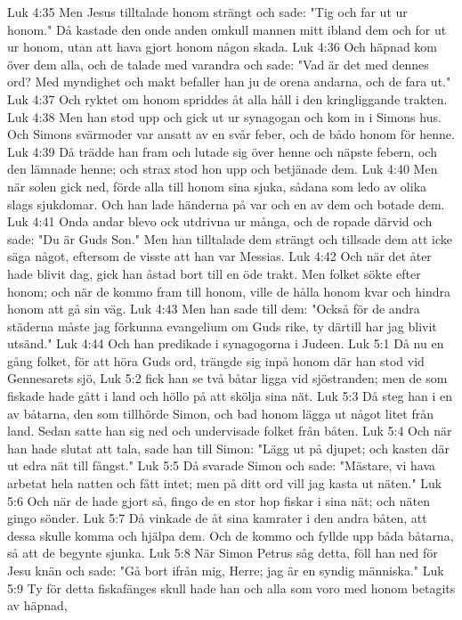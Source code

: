 Luk 4:35  Men Jesus tilltalade honom strängt och sade: "Tig och far ut ur honom." Då kastade den onde anden omkull mannen mitt ibland dem och for ut ur honom, utan att hava gjort honom någon skada.
Luk 4:36  Och häpnad kom över dem alla, och de talade med varandra och sade: "Vad är det med dennes ord? Med myndighet och makt befaller han ju de orena andarna, och de fara ut."
Luk 4:37  Och ryktet om honom spriddes åt alla håll i den kringliggande trakten.
Luk 4:38  Men han stod upp och gick ut ur synagogan och kom in i Simons hus. Och Simons svärmoder var ansatt av en svår feber, och de bådo honom för henne.
Luk 4:39  Då trädde han fram och lutade sig över henne och näpste febern, och den lämnade henne; och strax stod hon upp och betjänade dem.
Luk 4:40  Men när solen gick ned, förde alla till honom sina sjuka, sådana som ledo av olika slags sjukdomar. Och han lade händerna på var och en av dem och botade dem.
Luk 4:41  Onda andar blevo ock utdrivna ur många, och de ropade därvid och sade: "Du är Guds Son." Men han tilltalade dem strängt och tillsade dem att icke säga något, eftersom de visste att han var Messias.
Luk 4:42  Och när det åter hade blivit dag, gick han åstad bort till en öde trakt. Men folket sökte efter honom; och när de kommo fram till honom, ville de hålla honom kvar och hindra honom att gå sin väg.
Luk 4:43  Men han sade till dem: "Också för de andra städerna måste jag förkunna evangelium om Guds rike, ty därtill har jag blivit utsänd."
Luk 4:44  Och han predikade i synagogorna i Judeen.
Luk 5:1  Då nu en gång folket, för att höra Guds ord, trängde sig inpå honom där han stod vid Gennesarets sjö,
Luk 5:2  fick han se två båtar ligga vid sjöstranden; men de som fiskade hade gått i land och höllo på att skölja sina nät.
Luk 5:3  Då steg han i en av båtarna, den som tillhörde Simon, och bad honom lägga ut något litet från land. Sedan satte han sig ned och undervisade folket från båten.
Luk 5:4  Och när han hade slutat att tala, sade han till Simon: "Lägg ut på djupet; och kasten där ut edra nät till fångst."
Luk 5:5  Då svarade Simon och sade: "Mästare, vi hava arbetat hela natten och fått intet; men på ditt ord vill jag kasta ut näten."
Luk 5:6  Och när de hade gjort så, fingo de en stor hop fiskar i sina nät; och näten gingo sönder.
Luk 5:7  Då vinkade de åt sina kamrater i den andra båten, att dessa skulle komma och hjälpa dem. Och de kommo och fyllde upp båda båtarna, så att de begynte sjunka.
Luk 5:8  När Simon Petrus såg detta, föll han ned för Jesu knän och sade: "Gå bort ifrån mig, Herre; jag är en syndig människa."
Luk 5:9  Ty för detta fiskafänges skull hade han och alla som voro med honom betagits av häpnad,
